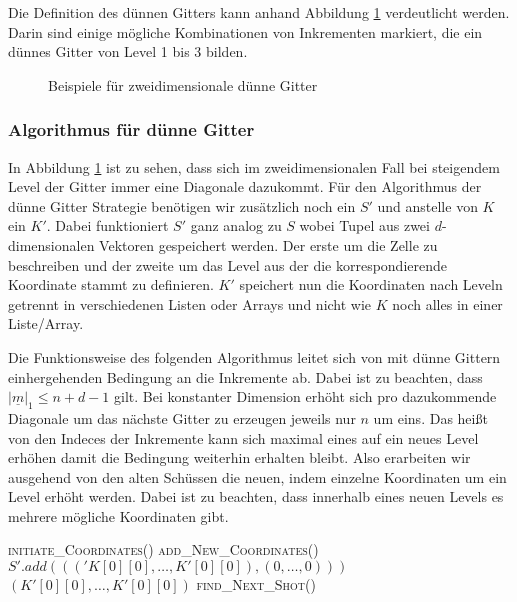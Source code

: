 \documentclass[a4paper,12pt]{llncs}
\numberwithin{equation}{section}
\begin{document}
Die Definition des dünnen Gitters kann anhand Abbildung \ref{fig:gitter03} verdeutlicht werden. Darin sind einige mögliche Kombinationen von Inkrementen markiert, die ein dünnes Gitter von Level 1 bis 3 bilden.

\begin{figure}
	\caption{Beispiele für zweidimensionale dünne Gitter}
	\label{fig:gitter03}
\end{figure}

\subsubsection{Algorithmus für dünne Gitter}

In Abbildung \ref{fig:gitter03} ist zu sehen, dass sich im zweidimensionalen Fall bei steigendem Level der Gitter immer eine Diagonale dazukommt. Für den Algorithmus der dünne Gitter Strategie benötigen wir zusätzlich noch ein $S'$ und anstelle von $K$ ein $K'$. Dabei funktioniert $S'$ ganz analog zu $S$ wobei Tupel aus zwei $d$-dimensionalen Vektoren gespeichert werden. Der erste um die Zelle zu beschreiben und der zweite um das Level aus der die korrespondierende Koordinate stammt zu definieren. $K'$ speichert nun die Koordinaten nach Leveln getrennt in verschiedenen Listen oder Arrays und nicht wie $K$ noch alles in einer Liste/Array.

Die Funktionsweise des folgenden Algorithmus leitet sich von mit dünne Gittern einhergehenden Bedingung an die Inkremente ab. Dabei ist zu beachten, dass $|\underline{m}|_1\leq n+d-1$ gilt. Bei konstanter Dimension erhöht sich pro dazukommende Diagonale um das nächste Gitter zu erzeugen jeweils nur $n$ um eins. Das heißt von den Indeces der Inkremente kann sich maximal eines auf ein neues Level erhöhen damit die Bedingung weiterhin erhalten bleibt. Also erarbeiten wir ausgehend von den alten Schüssen  die neuen, indem einzelne Koordinaten um ein Level erhöht werden. Dabei ist zu beachten, dass innerhalb eines neuen Levels es mehrere mögliche Koordinaten gibt. 


\begin{tcolorbox}
	\begin{algorithmic}
		\State \textsc{initiate\_Coordinates}()
		\EndIf
		\State \textsc{add\_New\_Coordinates}()
		\EndIf
		\State $S'.add((('K[0][0],\dots,K'[0][0]),(0,\dots,0)))$
		\State \Return $(K'[0][0],\dots,K'[0][0])$
		\Else
		\State \textsc{find\_Next\_Shot}()
		\EndIf
		\EndFunction
	\end{algorithmic}
\end{tcolorbox}
\end{document}
